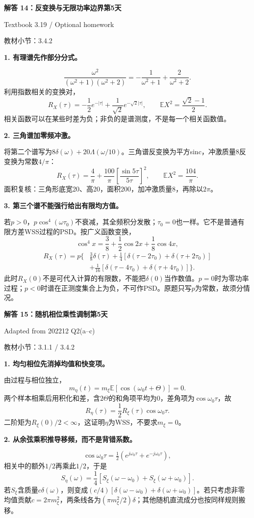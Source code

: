 \documentclass[10.5pt,fontset=fandol]{ctexart}
\newcommand{\E}{\mathbb E}\newcommand{\ee}{\mathrm e}\newcommand{\jj}{\mathrm j}
\newcommand{\qtitle}[2]{\par\addvspace{.85em}\Needspace{10\baselineskip}\begin{tcolorbox}[colback=navy,colframe=navy,arc=1.5pt,boxrule=0pt]\color{white}\large\bfseries #1\hfill\small #2\end{tcolorbox}}
\newcommand{\step}[1]{\par\addvspace{.4em}\Needspace{4\baselineskip}\textbf{#1}\par}\hypersetup{pdftitle={SSA Chapter 3 Review Solutions - Chinese}}
\begin{document}
\qtitle{解答 14：反变换与无限功率边界}{第5天}
{\small\color{accentred}Textbook 3.19 / Optional homework}\par{\small\color{muted}教材小节：3.4.2}\par\smallskip\step{1. 有理谱先作部分分式。}
\[\frac{\omega^2}{(\omega^2+1)(\omega^2+2)}
=-\frac1{\omega^2+1}+\frac2{\omega^2+2}.\]
利用指数相关的变换对，
\[\boxed{R_X(\tau)=-\frac12e^{-|\tau|}+\frac1{\sqrt2}e^{-\sqrt2|\tau|}},
\qquad\boxed{\E X^2=\frac{\sqrt2-1}{2}}.\]
相关函数可以在某些时差为负；非负的是谱测度，不是每一个相关函数值。
\step{2. 三角谱加零频冲激。}
将第二个谱写为$8\delta(\omega)+20\Lambda(\omega/10)$。三角谱反变换为平方sinc，冲激质量8反变换为常数$4/\pi$：
\[\boxed{R_X(\tau)=\frac4\pi+\frac{100}\pi\left[\frac{\sin5\tau}{5\tau}\right]^2},
\qquad\boxed{\E X^2=\frac{104}\pi}.\]
面积复核：三角形底宽20、高20，面积200，加冲激质量8，再除以$2\pi$。
\step{3. 第三个谱不能强行给出有限均方值。}
若$p>0$，$p\cos^4(\omega\tau_0)$不衰减，其全频积分发散；$\tau_0=0$也一样。它不是普通有限方差WSS过程的PSD。按广义函数变换，
\[\cos^4x=\frac38+\frac12\cos2x+\frac18\cos4x,\]
\[\boxed{\begin{aligned}
R_X(\tau)=p\bigl\{&\tfrac38\delta(\tau)+\tfrac14[\delta(\tau-2\tau_0)+\delta(\tau+2\tau_0)]\\
&+\tfrac1{16}[\delta(\tau-4\tau_0)+\delta(\tau+4\tau_0)]\bigr\}.
\end{aligned}}\]
此时$R_X(0)$不是可代入计算的有限数，不能把$\delta(0)$当作数值。$p=0$时为零功率过程；$p<0$时谱在正测度集合上为负，不可作PSD。原题只写$p$为常数，故须分情况。

\qtitle{解答 15：随机相位乘性调制}{第5天}
{\small\color{accentred}Adapted from 202212 Q2(a--c)}\par{\small\color{muted}教材小节：3.1.1 / 3.4.2}\par\smallskip\step{1. 均匀相位先消掉均值和快变项。}
由过程与相位独立，
\[m_\eta(t)=m_\xi\E[\cos(\omega_0t+\Theta)]=0.\]
两个样本相乘后用积化和差，含$2\Theta$的和角项平均为0，差角项为$\cos\omega_0\tau$，故
\[\boxed{R_\eta(\tau)=\frac12R_\xi(\tau)\cos\omega_0\tau}.\]
二阶矩为$R_\xi(0)/2<\infty$，这证明$\eta$为WSS，不要求$m_\xi=0$。
\step{2. 从余弦乘积推导移频，而不是背错系数。}
\[\cos\omega_0\tau=\tfrac12(e^{j\omega_0\tau}+e^{-j\omega_0\tau}),\]
相关中的额外$1/2$再乘此$1/2$，于是
\[\boxed{S_\eta(\omega)=\frac14[S_\xi(\omega-\omega_0)+S_\xi(\omega+\omega_0)]}.\]
若$S_\xi$含质量$c\delta(\omega)$，则变成$(c/4)[\delta(\omega-\omega_0)+\delta(\omega+\omega_0)]$。若只考虑非零均值贡献$c=2\pi m_\xi^2$，两条线各为$(\pi m_\xi^2/2)\delta$；其他随机直流成分也按同样规则搬移。
\end{document}
